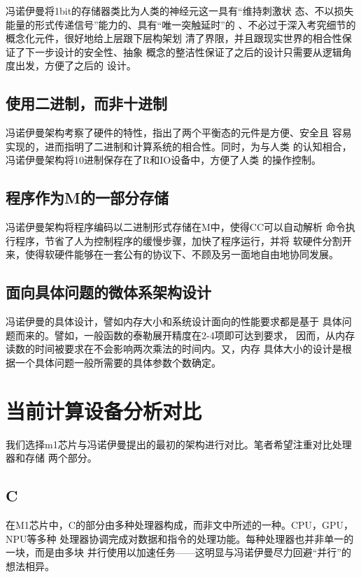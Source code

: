 \documentclass[UTF8]{ctexart}
\begin{document}
冯诺伊曼将1bit的存储器类比为人类的神经元这一具有“维持刺激状
态、不以损失能量的形式传递信号”能力的、具有“唯一突触延时”的
、不必过于深入考究细节的概念化元件，很好地给上层跟下层构架划
清了界限，并且跟现实世界的相合性保证了下一步设计的安全性、抽象
概念的整洁性保证了之后的设计只需要从逻辑角度出发，方便了之后的
设计。

\subsection{使用二进制，而非十进制}

冯诺伊曼架构考察了硬件的特性，指出了两个平衡态的元件是方便、安全且
容易实现的，进而指明了二进制和计算系统的相合性。同时，为与人类
的认知相合，冯诺伊曼架构将10进制保存在了R和IO设备中，方便了人类
的操作控制。

\subsection{程序作为M的一部分存储}

冯诺伊曼架构将程序编码以二进制形式存储在M中，使得CC可以自动解析
命令执行程序，节省了人为控制程序的缓慢步骤，加快了程序运行，并将
软硬件分割开来，使得软硬件能够在一套公有的协议下、不顾及另一面地自由地协同发展。

\subsection{面向具体问题的微体系架构设计}

冯诺伊曼的具体设计，譬如内存大小和系统设计面向的性能要求都是基于
具体问题而来的。譬如，一般函数的泰勒展开精度在2-4项即可达到要求，
因而，从内存读数的时间被要求在不会影响两次乘法的时间内。又，内存
具体大小的设计是根据一个具体问题一般所需要的具体参数个数确定。

\section{当前计算设备分析对比}

我们选择m1芯片与冯诺伊曼提出的最初的架构进行对比。笔者希望注重对比处理器和存储
两个部分。

\subsection{C}

在M1芯片中，C的部分由多种处理器构成，而非文中所述的一种。CPU，GPU，NPU等多种
处理器协调完成对数据和指令的处理功能。每种处理器也并非单一的一块，而是由多块
并行使用以加速任务——这明显与冯诺伊曼尽力回避“并行”的想法相异。
\end{document}
